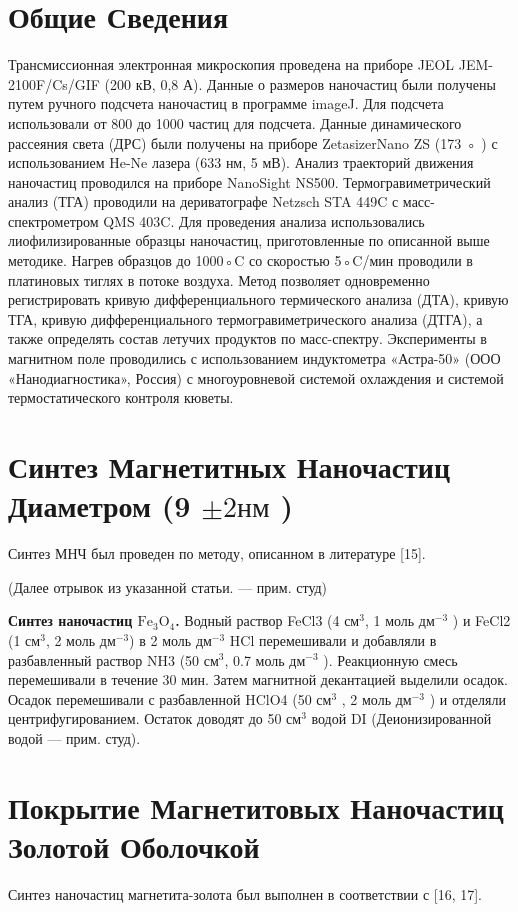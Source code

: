 \documentclass[12pt, a4paper]{article}
\begin{document}
\section*{Общие Сведения}
Трансмиссионная электронная микроскопия проведена на приборе JEOL JEM-2100F/Cs/GIF (200 кВ, 0,8 А). Данные о
размеров наночастиц были получены путем ручного подсчета наночастиц в программе imageJ. Для подсчета использовали от 800 до 1000 частиц
для подсчета. Данные динамического рассеяния света (ДРС) были получены на приборе ZetasizerNano ZS (173 ◦ ) с использованием He-Ne
лазера (633 нм, 5 мВ). Анализ траекторий движения наночастиц проводился на приборе NanoSight NS500. Термогравиметрический
анализ (ТГА) проводили на дериватографе Netzsch STA 449C с масс-спектрометром QMS 403C. Для проведения
анализа использовались лиофилизированные образцы наночастиц, приготовленные по описанной выше методике. Нагрев образцов
до 1000◦C со скоростью 5◦C/мин проводили в платиновых тиглях в потоке воздуха. Метод позволяет одновременно регистрировать
кривую дифференциального термического анализа (ДТА), кривую ТГА, кривую дифференциального термогравиметрического анализа (ДТГА), а также
определять состав летучих продуктов по масс-спектру. Эксперименты в магнитном поле проводились
с использованием индуктометра «Астра-50» (ООО «Нанодиагностика», Россия) с многоуровневой системой охлаждения и системой
термостатического контроля кюветы.

\section*{Синтез Магнетитных Наночастиц Диаметром (9 \(\pm 2 \text{нм}\) )}
Синтез МНЧ был проведен по методу, описанном в литературе [15].

(Далее отрывок из указанной статьи. --- прим. студ)

\textbf{Синтез наночастиц $\text{Fe}_3\text{O}_4$.}  Водный раствор FeCl3 (4 $\text{см}^3$, 1 моль $\text{дм}^{-3}$ ) и FeCl2 (1 $\text{см}^3$, 2 моль $\text{дм}^{-3}$) в 2 моль $\text{дм}^{-3}$ HCl перемешивали и добавляли в разбавленный раствор NH3 (50 $\text{см}^3$, 0.7 моль $\text{дм}^{-3}$ ). Реакционную смесь перемешивали в течение 30 мин. Затем магнитной декантацией выделили осадок. Осадок перемешивали с разбавленной HClO4 (50 $\text{см}^3$ , 2 моль $\text{дм}^{-3}$ ) и отделяли центрифугированием. Остаток доводят до 50 $\text{см}^3$ водой DI (Деионизированной водой --- прим. студ). 

\section*{Покрытие Магнетитовых Наночастиц Золотой Оболочкой}
Синтез наночастиц магнетита-золота был выполнен в соответствии с [16, 17].
\end{document}
